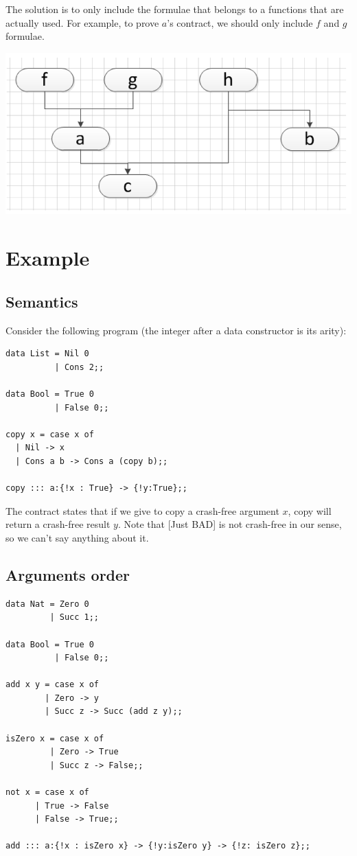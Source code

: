 \documentclass{article}
\begin{document}
The solution is to only include the formulae that belongs to a
functions that are actually used. For example, to prove $a$'s
contract, we should only include $f$ and $g$ formulae.

\begin{center}
\includegraphics[scale=0.5]{flow.png}
\end{center}



\section{Example}


\subsection{Semantics}
Consider the following program (the integer after a data constructor is its arity):
\begin{verbatim}
data List = Nil 0
          | Cons 2;;

data Bool = True 0
          | False 0;;

copy x = case x of
  | Nil -> x
  | Cons a b -> Cons a (copy b);;

copy ::: a:{!x : True} -> {!y:True};;
\end{verbatim}
The contract states that if we give to copy a crash-free argument $x$, copy will return a crash-free result $y$.
Note that [Just BAD] is not crash-free in our sense, so we can't say anything about it. 


\subsection{Arguments order}
\begin{verbatim}
data Nat = Zero 0
         | Succ 1;;

data Bool = True 0
          | False 0;;

add x y = case x of
        | Zero -> y
        | Succ z -> Succ (add z y);;

isZero x = case x of
         | Zero -> True
         | Succ z -> False;;

not x = case x of
      | True -> False
      | False -> True;;

add ::: a:{!x : isZero x} -> {!y:isZero y} -> {!z: isZero z};;
\end{verbatim}
\end{document}
